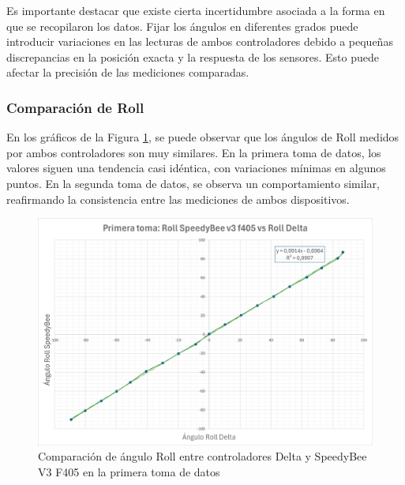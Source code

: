 \vspace{5px}
Es importante destacar que existe cierta incertidumbre asociada a la forma en que se recopilaron los datos. Fijar los ángulos en diferentes grados puede introducir variaciones en las lecturas de ambos controladores debido a pequeñas discrepancias en la posición exacta y la respuesta de los sensores. Esto puede afectar la precisión de las mediciones comparadas.
\vspace{5px}

\subsubsection{Comparación de Roll}
En los gráficos de la Figura \ref{fig:comparacionRoll}, se puede observar que los ángulos de Roll medidos por ambos controladores son muy similares. En la primera toma de datos, los valores siguen una tendencia casi idéntica, con variaciones mínimas en algunos puntos. En la segunda toma de datos, se observa un comportamiento similar, reafirmando la consistencia entre las mediciones de ambos dispositivos.
\begin{figure}[H]
    \centering
    \includegraphics[width=5.5 in]{Imagenes/Pruebas/roll_1_compare.png}
    \caption{Comparación de ángulo Roll entre controladores Delta y SpeedyBee V3 F405 en la primera toma de datos }
    \label{fig:comparacionRoll}
\end{figure}

